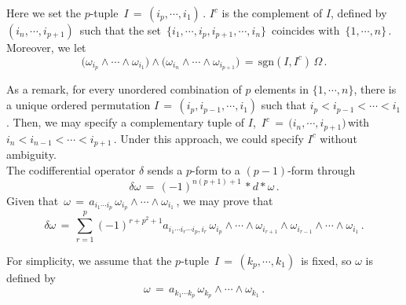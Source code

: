 \documentclass{article}[12pt,a4paper]
\begin{document}
Here we set the $p$-tuple \,$I \,=\, (i_p, \cdots, i_1)$\,. $I^c$ is the complement of $I$, 
defined by \,$(i_{n}, \cdots, i_{p+1})$\, such that the set \,$\big\{i_1, \cdots, i_p, i_{p+1}, \cdots, i_n \big\}$\,
coincides with \,$\big\{1, \cdots, n\big\}$\,. Moreover, we let 
$$ \big(\omega_{i_p} \wedge \cdots \wedge \omega_{i_1}\big) \wedge 
	\big(\omega_{i_n} \wedge \cdots \wedge \omega_{i_{p+1}}\big) \,=\, \mbox{sgn}(I, I^c) \, \Omega\,.$$

As a remark, for every unordered combination of $p$ elements in $\{1, \cdots, n\}$, 
there is a unique ordered permutation $I \,=\, (i_p, i_{p-1}, \cdots, i_1)$ such that 
$i_p < i_{p-1} < \cdots < i_1$. Then, we may specify a complementary tuple of $I$, 
\,$I^c \,=\, \big(i_n, \cdots, i_{p+1}\big)$\,with \,$i_n < i_{n-1} < \cdots < i_{p+1}$\,.
Under this approach, we could specify $I^c$ without ambiguity. \\

The codifferential operator $\delta$ sends a $p$-form to a $(p-1)$-form through
$$ \delta \omega \,=\, (-1)^{n(p+1)+1} \, \ast d \ast \omega \,. $$
Given that \,$\omega \,=\, a_{i_1\cdots i_p}\, \omega_{i_p} \wedge \cdots \wedge \omega_{i_1}$\,, we may prove that 
\begin{equation}
	\delta \omega \,=\, \sum_{r=1}^p (-1)^{r+p^2+1} a_{i_1\cdots i_r\cdots i_p, i_r}\,
	\omega_{i_p} \wedge\cdots\wedge \omega_{i_{r+1}} \wedge \omega_{i_{r-1}} \wedge\cdots\wedge \omega_{i_1} \,.
\end{equation}

For simplicity, we assume that the $p$-tuple \,$I\,=\,(k_p, \cdots, k_1)$\, is fixed, so $\omega$ is defined by
$$ \omega \,=\, a_{k_1\cdots k_p}\, \omega_{k_p}\wedge \cdots \wedge \omega_{k_1}\,.$$
\newpage 
\end{document}
